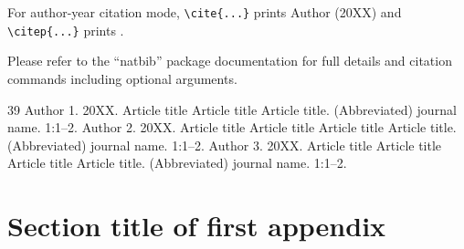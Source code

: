 \documentclass{sysbio}%
\begin{document}
For author-year citation mode, \verb+\cite{...}+ prints Author (20XX) and \verb+\citep{...}+ prints \citep{Author20XX}.

Please refer to the ``natbib'' package documentation for full details and citation commands including optional arguments. 





%
%


\begin{thebibliography}{39}
Author 1. 20XX. Article title Article title Article title. (Abbreviated) journal name. 1:1--2.
Author 2. 20XX. Article title Article title Article title Article title. (Abbreviated) journal name. 1:1--2.
Author 3. 20XX. Article title Article title Article title Article title. (Abbreviated) journal name. 1:1--2.
\end{thebibliography}


\vfill\eject

\appendix

\section{Section title of first appendix}\label{appsec1}
\end{document}
